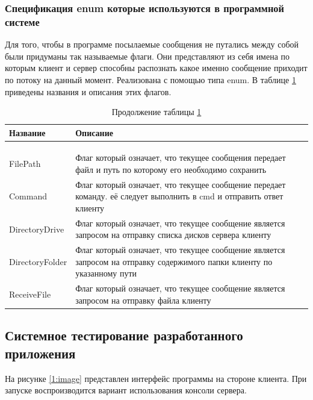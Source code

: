 \subsubsection{Спецификация enum которые используются в программной системе}
Для того, чтобы в программе посылаемые сообщения не путались между собой были придуманы так называемые флаги. Они представляют из себя имена по которым клиент и сервер способны распознать какое именно сообщение приходит по потоку на данный момент. Реализована с помощью типа enum. В таблице \ref{class:tableEnum} приведены названия и описания этих флагов.

\begin{longtable}[l]{|p{4.25cm}|p{10.55cm}|}
	\caption{Описание флагов в enum\label{class:tableEnum}}\\
	\hline \centrow Название & \centrow Описание \\
	\hline \centrow 1 & \centrow 2 \\
	\endfirsthead
	\caption*{Продолжение таблицы \ref{class:tableEnum}}\\
	\hline \centrow 1 & \centrow 2 \\
	\finishhead
	\hline FilePath & Флаг который означает, что текущее сообщения передает файл и путь по которому его необходимо сохранить \\
	\hline Command & Флаг который означает, что текущее сообщение передает команду. её следует выполнить в cmd и отправить ответ клиенту\\
	\hline DirectoryDrive & Флаг который означает, что текущее сообщение является запросом на отправку списка дисков сервера клиенту\\
	\hline DirectoryFolder & Флаг который означает, что текущее сообщение является запросом на отправку содержимого папки клиенту по указанному пути\\
	\hline ReceiveFile & Флаг который означает, что текущее сообщение является запросом на отправку файла клиенту
\end{longtable}
\vspace{-\tablebelowskip}

\subsection{Системное тестирование разработанного приложения}

На рисунке \ref{1:image} представлен интерфейс программы на стороне клиента. При запуске воспроизводится вариант использования консоли сервера.

